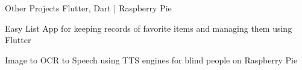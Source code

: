 \begin{cventries}
  \projects
    {} %
    {{Other Projects}} %
    {Flutter, Dart | Raspberry Pie} %
    {} %
    {
      \begin{cvitems} %
        \item {Easy List App for keeping records of favorite items and managing them using Flutter}
        \item {Image to OCR to Speech using TTS engines for blind people on Raspberry Pie}
      \end{cvitems}
    }

 


  


 


\end{cventries}
